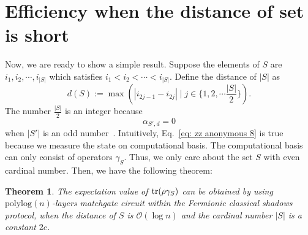 \documentclass{article}
\newtheorem{theorem}{Theorem}
\newcommand{\polylog}{\mathrm{polylog}}
\begin{document}
\section{Efficiency when the distance of set is short}
Now, we are ready to show a simple result. 
Suppose the elements of $S$ are $i_1, i_2, \cdots, i_{|S|}$ which satisfies $i_1 < i_2 < \cdots < i_{|S|}$.
Define the distance of $|S|$ as
\begin{equation}
    d(S) := \max(|i_{2j-1}-i_{2j}|\mid j \in \{1, 2, \cdots \frac{|S|}{2}\}).
\end{equation}
The number $\frac{|S|}{2}$ is an integer because 
\begin{equation}
    \alpha_{S', d} =0
    \label{eq: zz anonymous 8}
\end{equation}
when $|S'|$ is an odd number~\cite{wan2022matchgate}. Intuitively, Eq.~\eqref{eq: zz anonymous 8} is true because we measure the state on computational basis. The computational basis can only consist of operators $\gamma_S$. Thus, we only care about the set $S$ with even cardinal number.
Then, we have the following theorem:
\begin{theorem}
The expectation value of $\tr(\rho \gamma_S)$ can be obtained by using $\polylog(n)$-layers matchgate circuit within the Fermionic classical shadows protocol, when the distance of $S$ is $\mathcal{O}(\log n)$ and the cardinal number $|S|$ is a constant $2c$.
\end{theorem}
\end{document}
